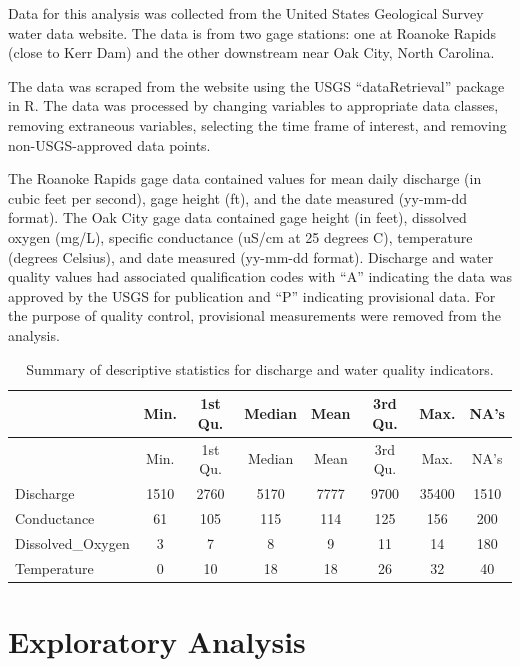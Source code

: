 \documentclass[12pt,]{article}
\begin{document}
Data for this analysis was collected from the United States Geological
Survey water data website. The data is from two gage stations: one at
Roanoke Rapids (close to Kerr Dam) and the other downstream near Oak
City, North Carolina.

The data was scraped from the website using the USGS ``dataRetrieval''
package in R. The data was processed by changing variables to
appropriate data classes, removing extraneous variables, selecting the
time frame of interest, and removing non-USGS-approved data points.

The Roanoke Rapids gage data contained values for mean daily discharge
(in cubic feet per second), gage height (ft), and the date measured
(yy-mm-dd format). The Oak City gage data contained gage height (in
feet), dissolved oxygen (mg/L), specific conductance (uS/cm at 25
degrees C), temperature (degrees Celsius), and date measured (yy-mm-dd
format). Discharge and water quality values had associated qualification
codes with ``A'' indicating the data was approved by the USGS for
publication and ``P'' indicating provisional data. For the purpose of
quality control, provisional measurements were removed from the
analysis.

\begin{longtable}[]{@{}lccccccc@{}}
\caption{Summary of descriptive statistics for discharge and water
quality indicators.}\tabularnewline
\toprule
& Min. & 1st Qu. & Median & Mean & 3rd Qu. & Max. & NA's\tabularnewline
\midrule
\endfirsthead
\toprule
& Min. & 1st Qu. & Median & Mean & 3rd Qu. & Max. & NA's\tabularnewline
\midrule
\endhead
Discharge & 1510 & 2760 & 5170 & 7777 & 9700 & 35400 &
1510\tabularnewline
Conductance & 61 & 105 & 115 & 114 & 125 & 156 & 200\tabularnewline
Dissolved\_Oxygen & 3 & 7 & 8 & 9 & 11 & 14 & 180\tabularnewline
Temperature & 0 & 10 & 18 & 18 & 26 & 32 & 40\tabularnewline
\bottomrule
\end{longtable}

\newpage

\hypertarget{exploratory-analysis}{%
\section{Exploratory Analysis}\label{exploratory-analysis}}
\end{document}
